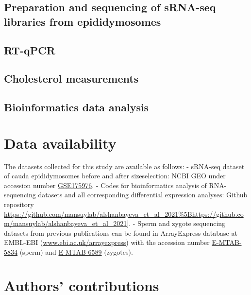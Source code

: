 \documentclass[12pt,twoside]{reedthesis}
\begin{document}
\hypertarget{preparation-and-sequencing-of-srna-seq-libraries-from-epididymosomes}{%
\subsection{Preparation and sequencing of sRNA-seq libraries from epididymosomes}\label{preparation-and-sequencing-of-srna-seq-libraries-from-epididymosomes}}

\hypertarget{rt-qpcr}{%
\subsection{RT-qPCR}\label{rt-qpcr}}

\hypertarget{cholesterol-measurements}{%
\subsection{Cholesterol measurements}\label{cholesterol-measurements}}

\hypertarget{bioinformatics-data-analysis}{%
\subsection{Bioinformatics data analysis}\label{bioinformatics-data-analysis}}

\hypertarget{data-availability}{%
\section{Data availability}\label{data-availability}}

The datasets collected for this study are available as follows:
- sRNA-seq dataset of cauda epididymosomes before and after sizeselection: NCBI GEO under accession number \href{https://www.ncbi.nlm.nih.gov/geo/query/acc.cgi?acc=GSE175976}{GSE175976}.
- Codes for bioinformatics analysis of RNA-sequencing datasets and
all corresponding differential expression analyses: Github repository \url{https://github.com/mansuylab/alshanbayeva_et_al_2021\%5Bhttps://github.com/mansuylab/alshanbayeva_et_al_2021}{]}.
- Sperm and zygote sequencing datasets from previous publications
can be found in ArrayExpress database at EMBL-EBI (\url{www.ebi.ac.uk/arrayexpress}) with the accession number \href{https://www.ebi.ac.uk/arrayexpress/experiments/E-MTAB-5834/}{E-MTAB-5834} (sperm) and \href{https://www.ebi.ac.uk/arrayexpress/experiments/E-MTAB-6589/}{E-MTAB-6589} (zygotes).

\newpage

\hypertarget{authors-contributions}{%
\section{Authors' contributions}\label{authors-contributions}}
\end{document}
